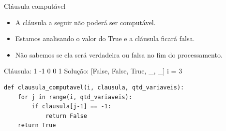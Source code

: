 \documentclass[compress,aspectratio=169]{beamer}
\begin{document}
    \begin{frame}[fragile]{Cláusula computável}
        \begin{itemize}
            \item A cláusula a seguir não poderá ser computável.
            \item Estamos analisando o valor do True e a cláusula ficará falsa.
            \item Não sabemos se ela será verdadeira ou falsa no fim do processamento.
        \end{itemize}
        \begin{tcolorbox}[width=\linewidth, fontupper=\ttfamily,  halign=flush left]
            Cláusula: 1 -1 0 0 1 \newline 
            Solução: [False, False, True, \_, \_] \newline
            i = 3
        \end{tcolorbox}
        \begin{lstlisting}
def clausula_computavel(i, clausula, qtd_variaveis):  
    for j in range(i, qtd_variaveis):
        if clausula[j-1] == -1:
            return False
    return True
        \end{lstlisting}
    \end{frame}
\end{document}
